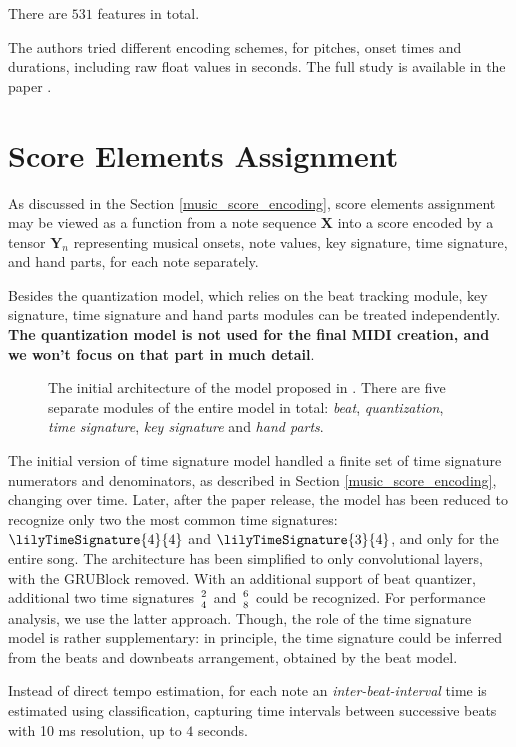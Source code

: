 There are $531$ features in total.

The authors tried different encoding schemes, for pitches, onset times and durations, including raw float values in seconds. The full study is available in the paper \cite{Liu2022}.

\section{Score Elements Assignment}

As discussed in the Section \ref{music_score_encoding}, score elements assignment may be viewed as a function from a note sequence $\mathbf{X}$ into a score encoded by a tensor $\mathbf{Y}_n$ representing musical onsets, note values, key signature, time signature, and hand parts, for each note separately.

Besides the quantization model, which relies on the beat tracking module, key signature, time signature and hand parts modules can be treated independently. \textbf{The quantization model is not used for the final MIDI creation, and we won't focus on that part in much detail}.

\begin{figure}[!ht]
\centering

\caption[The initial architecture of the model.]{The initial architecture of the model proposed in \cite{Liu2022}. There are five separate modules of the entire model in total: \emph{beat}, \emph{quantization}, \emph{time signature}, \emph{key signature} and \emph{hand parts}.}
\end{figure}

The initial version of time signature model handled a finite set of time signature numerators and denominators, as described in Section \ref{music_score_encoding}, changing over time. Later, after the paper release, the model has been reduced to recognize only two the most common time signatures: $\lilyTimeSignature{4}{4}$ and $\lilyTimeSignature{3}{4}$, and only for the entire song. The architecture has been simplified to only convolutional layers, with the GRUBlock removed. With an additional support of beat quantizer, additional two time signatures ${2 \atop 4}$ and ${6 \atop 8}$ could be recognized. For performance analysis, we use the latter approach. Though, the role of the time signature model is rather supplementary: in principle, the time signature could be inferred from the beats and downbeats arrangement, obtained by the beat model.

Instead of direct tempo estimation, for each note an \emph{inter-beat-interval} time is estimated using classification, capturing time intervals between successive beats with 10 ms resolution, up to $4$ seconds.

